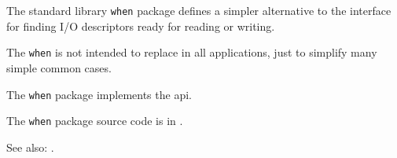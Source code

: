 
The standard library {\tt when} package defines a simpler alternative to 
the  interface for finding I/O descriptors 
ready for reading or writing.

The {\tt when} is not intended to replace 
 in all applications, just to simplify 
many simple common cases.

The {\tt when} package implements the  api.

The {\tt when} package source code is in .

See also:  .